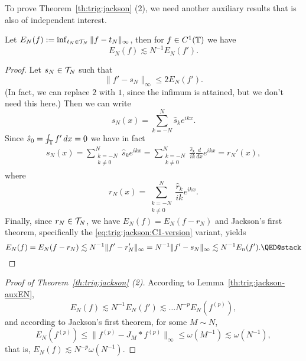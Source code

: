 To prove Theorem~\ref{th:trig:jackson} (2), we need another auxiliary
results that is also of independent interest.

\begin{lemma} \label{th:trig:jackson-auxEN}
  Let $E_N(f) := \inf_{t_N \in \mathcal{T}_N} \|f - t_N \|_\infty$, then for
  $f \in C^1(\mathbb{T})$ we have
  \[
    E_N(f) \lesssim N^{-1} E_N(f').
  \]
\end{lemma}
\begin{proof}
  Let $s_N \in \mathcal{T}_N$ such that
  \[
    \|f' - s_N\|_\infty \leq 2 E_N(f').
  \]
  (In fact, we can replace $2$ with $1$, since the infimum is attained, but
    we don't need this here.) Then we can write
  \[
    s_N(x) = \sum_{k = -N}^N \hat{s}_{k} e^{ikx}.
  \]
  Since $\hat{s}_{0} = \mint_\TT f' \,dx = 0$ we have in fact
  \begin{align*}
    s_N(x)
    =
    \sum_{\substack{k = -N \\ k \neq 0}}^N \hat{s}_{k} e^{ikx}
    =
    \sum_{\substack{k = -N \\ k \neq 0}}^N \frac{\hat{s}_{k}}{ik} \frac{d}{dx} e^{ikx}
    =
    r_N'(x),
  \end{align*}
  where
  \[
    r_N(x) =
    \sum_{\substack{k = -N \\ k \neq 0}}^N \frac{\hat{r}_{k}}{ik} e^{ikx}.
  \]
  Finally, since $r_N \in \mathcal{T}_N$, we have $E_N(f) = E_N(f - r_N)$ and
  Jackson's first theorem, specifically the \eqref{eq:trig:jackson:C1-version}
  variant, yields
  \[
    E_N(f)
    = E_N(f - r_N) \lesssim N^{-1} \| f' - r_N' \|_\infty
    = N^{-1} \| f' - s_N \|_\infty
    \lesssim N^{-1} E_n(f'). \qedhere
  \]
\end{proof}


\begin{proof}[Proof of Theorem~\ref{th:trig:jackson} (2)]
  According to Lemma~\ref{th:trig:jackson-auxEN},
  \[
    E_N(f) \lesssim N^{-1} E_N(f') \lesssim \dots
    N^{-p} E_N(f^{(p)}),
  \]
  and according to Jackson's first theorem, for some $M \sim N$,
  \[
    E_N(f^{(p)}) \leq \| f^{(p)} - J_M \ast f^{(p)} \|_\infty
      \leq \omega(M^{-1}) \lesssim \omega(N^{-1}),
  \]
  that is, $E_N(f) \lesssim N^{-p} \omega(N^{-1})$.
\end{proof}





